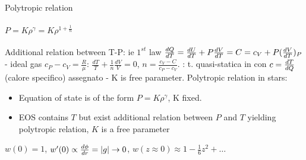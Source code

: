 \begin{frame}{Polytropic relation}
    \framesubtitle{$P=K\rho^{\gamma}=K\rho^{1+\frac{1}{n}}$}
Additional relation between T-P: ie $1^{st}$ law $\TDy{T}{Q}=\TDy{T}{U}+P\TDy{T}{V}=C=c_V+P(\TDy{T}{V})_P$ - ideal gas $c_P-c_V=\frac{R}{\mu}$: $\frac{dT}{T}+\frac{1}{n}\frac{dV}{V}=0$, $n=\frac{c_V-C}{c_P-c_V}$. : t. quasi-statica in  con $c=\TDy{Q}{T}$ (calore specifico) assegnato - K is free parameter.
Polytropic relation in stars:
\begin{itemize}
    \item Equation of state is of the form $P=K\rho^{\gamma}$, K fixed.
    \item EOS contains $T$ but exist additional relation between $P$ and $T$ yielding polytropic relation, $K$ is a free parameter
\end{itemize}
$w(0)=1$, $w'(0)\propto{}=|g|$, $w(z)-z^2+\ldots$
\end{frame}

